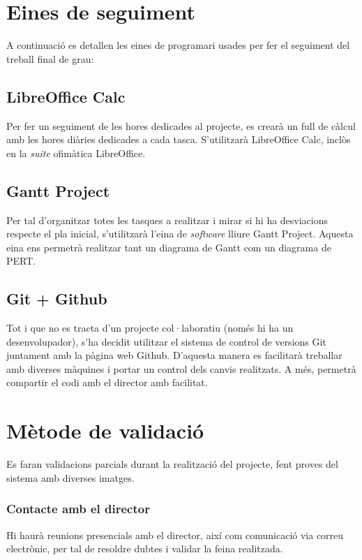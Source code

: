 \section{Eines de seguiment}
	A continuació es detallen les eines de programari usades per fer el seguiment del treball final de grau:
	\subsection{LibreOffice Calc}
		Per fer un seguiment de les hores dedicades al projecte, es crearà un full de càlcul amb les hores diàries dedicades a cada tasca. S'utilitzarà LibreOffice Calc, inclòs en
		la \textit{suite} ofimàtica LibreOffice.
	\subsection{Gantt Project}
		Per tal d'organitzar totes les tasques a realitzar i mirar si hi ha desviacions respecte el pla inicial, s'utilitzarà l'eina de \textit{software} lliure 
		Gantt Project\cite{GanttProject}. Aquesta eina ens permetrà realitzar tant un diagrama de Gantt com un diagrama de PERT.
	\subsection{Git + Github}
		Tot i que no es tracta d'un projecte col·laboratiu (només hi ha un desenvolupador), s'ha decidit utilitzar el sistema de control de versions Git juntament amb la pàgina web Github. 
		D'aquesta manera es facilitarà treballar amb diverses màquines i portar un control dels canvis realitzats. A més, permetrà compartir el codi amb el director amb facilitat.
	\section{Mètode de validació}
		Es faran validacions parcials durant la realització del projecte, fent proves del sistema amb diverses imatges.
	\subsubsection{Contacte amb el director}
		Hi haurà reunions presencials amb el director, així com comunicació via correu electrònic, per tal de resoldre dubtes i validar la feina realitzada.
